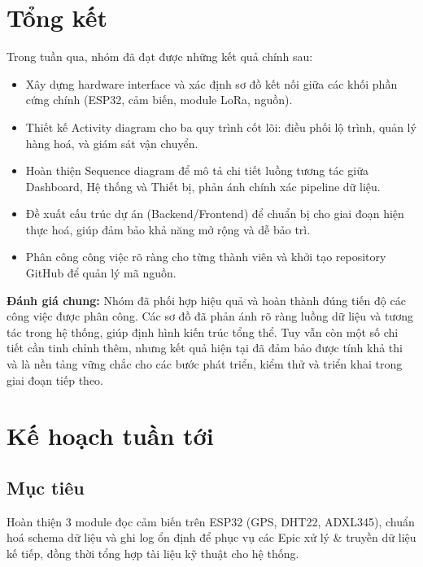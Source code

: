 \section{Tổng kết}
Trong tuần qua, nhóm đã đạt được những kết quả chính sau:

\begin{itemize}
\item Xây dựng hardware interface và xác định sơ đồ kết nối giữa các khối phần cứng chính (ESP32, cảm biến, module LoRa, nguồn).
\item Thiết kế Activity diagram cho ba quy trình cốt lõi: điều phối lộ trình, quản lý hàng hoá, và giám sát vận chuyển.
\item Hoàn thiện Sequence diagram để mô tả chi tiết luồng tương tác giữa Dashboard, Hệ thống và Thiết bị, phản ánh chính xác pipeline dữ liệu.
\item Đề xuất cấu trúc dự án (Backend/Frontend) để chuẩn bị cho giai đoạn hiện thực hoá, giúp đảm bảo khả năng mở rộng và dễ bảo trì.
\item Phân công công việc rõ ràng cho từng thành viên và khởi tạo repository GitHub để quản lý mã nguồn.
\end{itemize}

\noindent\textbf{Đánh giá chung:} Nhóm đã phối hợp hiệu quả và hoàn thành đúng tiến độ các công việc được phân công. Các sơ đồ đã phản ánh rõ ràng luồng dữ liệu và tương tác trong hệ thống, giúp định hình kiến trúc tổng thể. Tuy vẫn còn một số chi tiết cần tinh chỉnh thêm, nhưng kết quả hiện tại đã đảm bảo được tính khả thi và là nền tảng vững chắc cho các bước phát triển, kiểm thử và triển khai trong giai đoạn tiếp theo.

\section{Kế hoạch tuần tới}

\subsection*{Mục tiêu}
Hoàn thiện 3 module đọc cảm biến trên ESP32 (GPS, DHT22, ADXL345), chuẩn hoá schema dữ liệu và ghi log ổn định để phục vụ các Epic xử lý \& truyền dữ liệu kế tiếp, đồng thời tổng hợp tài liệu kỹ thuật cho hệ thống.

